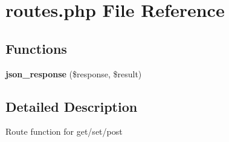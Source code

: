 \hypertarget{routes_8php}{}\section{routes.\+php File Reference}
\label{routes_8php}
\subsection*{Functions}
\begin{DoxyCompactItemize}
\item 
{\bfseries json\+\_\+response} (\$response, \$result)\hypertarget{routes_8php_a1addd60f2907ac9b5d58c5363d944bc1}{}\label{routes_8php_a1addd60f2907ac9b5d58c5363d944bc1}

\end{DoxyCompactItemize}


\subsection{Detailed Description}
Route function for get/set/post 